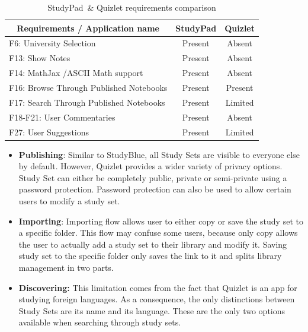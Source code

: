 \documentclass[thesis=B,english]{FITthesis}[2012/10/20]
\newcommand{\appname}{StudyPad}
\begin{document}
\begin{table}[H]
\caption{\appname\ \& Quizlet requirements comparison}
\label{tab:quizlet}
\begin{tabular}{|l|c|c|}
\hline
\multicolumn{1}{|c|}{\textbf{Requirements / Application name}} & \multicolumn{1}{l|}{\textbf{StudyPad}} & \multicolumn{1}{l|}{\textbf{Quizlet}} \\ \hline
F6: University Selection                                       & Present                                & Absent                                \\ \hline
F13: Show Notes                                                & Present                                & Absent                                \\ \hline
F14: MathJax /ASCII Math support                               & Present                                & Absent                                \\ \hline
F16: Browse Through Published Notebooks                        & Present                                & Present                               \\ \hline
F17: Search Through Published Notebooks                    & Present                                & Limited                               \\ \hline
F18-F21: User Commentaries                                     & Present                                & Absent                                \\ \hline
F27: User Suggestions                                          & Present                                & Limited                               \\ \hline
\end{tabular}
\end{table}

\begin{itemize}
	\item \textbf{Publishing}: Similar to StudyBlue, all Study Sets are visible to everyone else by default. However, Quizlet provides a wider variety of privacy options. Study Set can either be completely public, private or semi-private using a password protection. Password protection can also be used to allow certain users to modify a study set.
	\item \textbf{Importing}: Importing flow allows user to either copy or save the study set to a specific folder. This flow may confuse some users, because only copy allows the user to actually add a study set to their library and modify it. Saving study set to the specific folder only saves the link to it and splits library management in two parts.
	\item \textbf{Discovering:} This limitation comes from the fact that Quizlet is an app for studying foreign  languages. As a consequence, the only distinctions between Study Sets are its name and its language. These are the only two options available when searching through study sets.

\end{itemize}
\end{document}
